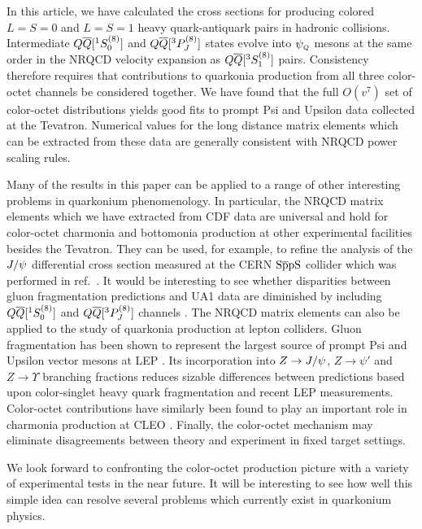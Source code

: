 {%

	In this article, we have calculated the cross sections for producing 
colored $L=S=0$ and $L=S=1$ heavy quark-antiquark pairs in hadronic 
collisions.  Intermediate $\QQbaroctetsingS$ and $\QQbaroctettripP$ states 
evolve into $\psiQ$ mesons at the same order in the NRQCD velocity expansion as 
$\QQbaroctettripS$ pairs.  Consistency therefore requires that contributions 
to quarkonia production from all three color-octet channels be considered 
together.  We have found that the full $O(v^7)$ set of color-octet 
distributions yields good fits to prompt Psi and Upsilon data collected at the 
Tevatron.  Numerical values for the long distance matrix elements which can be 
extracted from these data are generally consistent with NRQCD power scaling 
rules.  

	Many of the results in this paper can be applied to a range of other 
interesting problems in quarkonium phenomenology.  In particular, the NRQCD 
matrix elements which we have extracted from CDF data are universal and hold
for color-octet charmonia and bottomonia production at other experimental 
facilities besides the Tevatron.  They can be used, for example, to refine 
the analysis of the $\Jpsi$ differential cross section measured at the CERN 
${\rm S \bar{p}pS}$ collider which was performed in ref.~\CGMP.  It would be 
interesting to see whether disparities between gluon fragmentation predictions 
and UA1 data are diminished by including $\QQbaroctetsingS$ and 
$\QQbaroctettripP$ channels \UAone.  The NRQCD matrix elements can also be 
applied to the study of quarkonia production at lepton colliders.  Gluon 
fragmentation has been shown to represent the largest source of prompt Psi and 
Upsilon vector mesons at LEP .  Its incorporation into 
$Z \to \Jpsi$, $Z \to \psi'$ and $Z \to \Upsilon$ branching fractions reduces 
sizable differences between predictions based upon color-singlet heavy quark 
fragmentation and recent LEP measurements.  Color-octet contributions have 
similarly been found to play an important role in charmonia production at CLEO 
.  Finally, the color-octet mechanism may eliminate 
disagreements between theory and experiment in fixed target settings.

	We look forward to confronting the color-octet production picture 
with a variety of experimental tests in the near future.  
%
%
It will be interesting to see how well this simple idea can resolve several 
problems which currently exist in quarkonium physics. 

}
